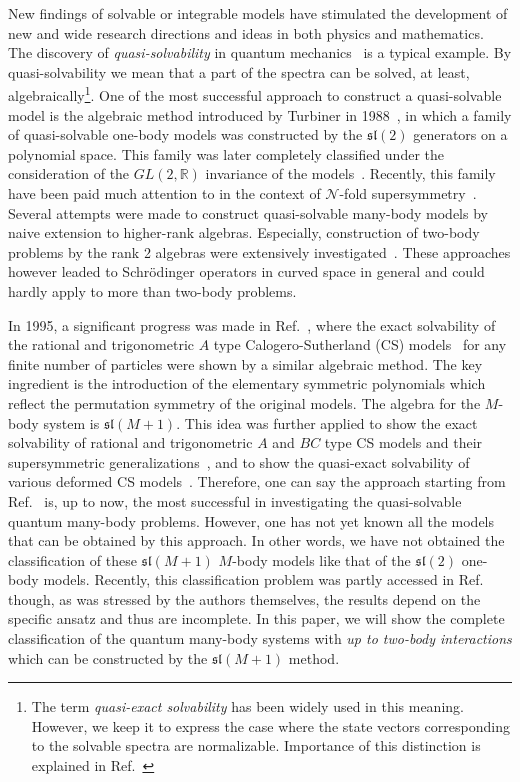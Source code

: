 \documentclass[a4paper,preprint,amsfonts,amssymb,amsmath,%
tightenlines,nofootinbib,noshowpacs]{revtex4}
\newcommand{\cN}{\mathcal{N}}
\newcommand{\bbR}{\mathbb{R}}
\newcommand{\Lsl}{\mathfrak{sl}}
\begin{document}
New findings of solvable or integrable models have stimulated
the development of new and wide research directions and ideas
in both physics and mathematics.
The discovery of \textit{quasi-solvability} in quantum
mechanics~\cite{TuUs1} is a typical example.
By quasi-solvability we mean that a part of the spectra can be
solved, at least, algebraically\footnote{The term \textit{
quasi-exact solvability} has been widely used in this meaning.
However, we keep it to express the case where the state vectors
corresponding to the solvable spectra are normalizable. Importance
of this distinction is explained in Ref.~\cite{AST2,ST1}}.
One of the most successful approach to construct a quasi-solvable
model is the algebraic method
introduced by Turbiner in 1988~\cite{Turbi1}, in which
a family of quasi-solvable one-body models was constructed by
the $\Lsl(2)$ generators on a polynomial space. This family was
later completely classified under the consideration of the
$GL(2,\bbR)$ invariance of the models~\cite{LoKaOl3,LoKaOl4}.
Recently, this family have been paid much attention to in the context
of $\cN$-fold supersymmetry~\cite{AKOSW2,ASTY,AST1,KlPl2,KlPl3,%
DoDuTa1,DoDuTa2,AST2,ANST1,ANST2,ST1}.
Several attempts were made to construct quasi-solvable many-body
models by naive extension to higher-rank algebras. Especially,
construction of two-body problems by the rank 2 algebras were
extensively investigated~\cite{LoKaOl4,ShTu1,Shifm1,LoKaOl1,%
LoKaOl2,Turbi2,Ushve}.
These approaches however leaded to Schr\"{o}dinger operators
in curved space in general and could hardly apply to more than
two-body problems.

In 1995, a significant progress was made in Ref.~\cite{RuTu1},
where the exact solvability of the rational
and trigonometric $A$ type Calogero-Sutherland (CS)
models~\cite{Calog1,Suthe1,Moser1} for any finite number of
particles were shown by a similar algebraic method. The key
ingredient is the introduction of the elementary symmetric
polynomials which reflect the permutation symmetry
of the original models. The algebra for the $M$-body system
is $\Lsl(M+1)$. This idea was further applied to
show the exact solvability of rational and trigonometric
$A$ and $BC$ type CS models and their supersymmetric
generalizations~\cite{BrTuWy1}, and to show the quasi-exact
solvability of various deformed CS models~\cite{MiRoTu1,HoSh1}.
Therefore, one can say the approach starting from Ref.~\cite{RuTu1}
is, up to now, the most successful in investigating the quasi-solvable
quantum many-body problems. However, one has not yet known all the
models that can be obtained by this approach. In other words, we
have not obtained the classification of these $\Lsl(M+1)$ $M$-body
models like that of the $\Lsl(2)$ one-body models. Recently, this
classification problem was partly accessed in Ref.~\cite{UlLoRo1}
though, as was stressed by the authors themselves, the results depend
on the specific ansatz and thus are incomplete.
In this paper, we will show the complete classification of the
quantum many-body systems with \textit{up to two-body interactions}
which can be constructed by the $\Lsl(M+1)$ method.
\end{document}
